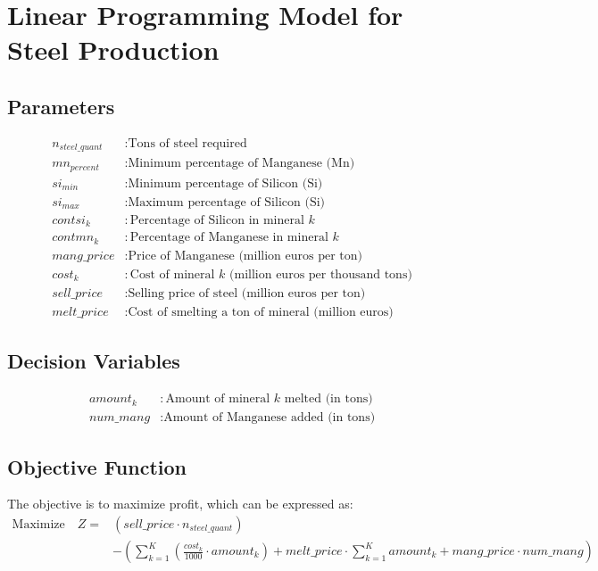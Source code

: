 \documentclass{article}
\begin{document}
\section*{Linear Programming Model for Steel Production}

\subsection*{Parameters}
\begin{align*}
n_{steel\_quant} & : \text{Tons of steel required} \\
mn_{percent} & : \text{Minimum percentage of Manganese (Mn)} \\
si_{min} & : \text{Minimum percentage of Silicon (Si)} \\
si_{max} & : \text{Maximum percentage of Silicon (Si)} \\
contsi_{k} & : \text{Percentage of Silicon in mineral } k \\
contmn_{k} & : \text{Percentage of Manganese in mineral } k \\
mang\_price & : \text{Price of Manganese (million euros per ton)} \\
cost_{k} & : \text{Cost of mineral } k \text{ (million euros per thousand tons)} \\
sell\_price & : \text{Selling price of steel (million euros per ton)} \\
melt\_price & : \text{Cost of smelting a ton of mineral (million euros)}
\end{align*}

\subsection*{Decision Variables}
\begin{align*}
amount_{k} & : \text{Amount of mineral } k \text{ melted (in tons)} \\
num\_mang & : \text{Amount of Manganese added (in tons)}
\end{align*}

\subsection*{Objective Function}
The objective is to maximize profit, which can be expressed as:
\begin{align*}
\text{Maximize} \quad Z = & \left( sell\_price \cdot n_{steel\_quant} \right) \\
& - \left( \sum_{k=1}^{K} \left( \frac{cost_{k}}{1000} \cdot amount_{k} \right) + melt\_price \cdot \sum_{k=1}^{K} amount_{k} + mang\_price \cdot num\_mang \right)
\end{align*}
\end{document}
